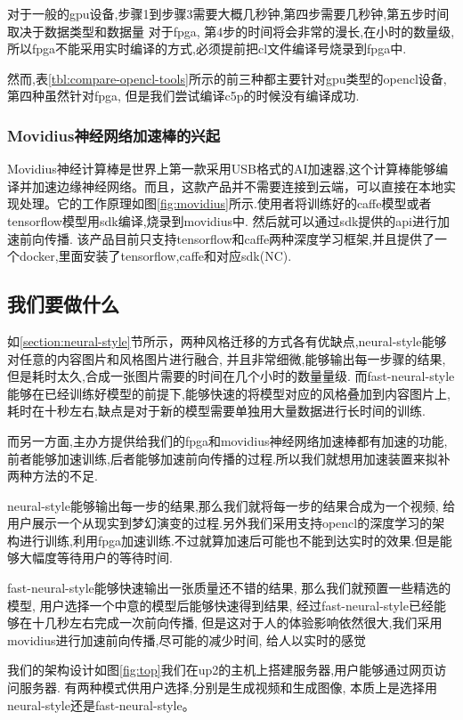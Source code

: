对于一般的gpu设备,步骤1到步骤3需要大概几秒钟,第四步需要几秒钟,第五步时间取决于数据类型和数据量
对于fpga, 第4步的时间将会非常的漫长,在小时的数量级,所以fpga不能采用实时编译的方式,必须提前把cl文件编译号烧录到fpga中.

然而,表\ref{tbl:compare-opencl-tools}所示的前三种都主要针对gpu类型的opencl设备,第四种虽然针对fpga, 但是我们尝试编译c5p的时候没有编译成功.

\subsubsection{Movidius神经网络加速棒的兴起}\label{sec:movidius}
Movidius神经计算棒是世界上第一款采用USB格式的AI加速器,这个计算棒能够编译并加速边缘神经网络。而且，这款产品并不需要连接到云端，可以直接在本地实现处理。它的工作原理如图\ref{fig:movidius}所示.使用者将训练好的caffe模型或者tensorflow模型用sdk编译,烧录到movidius中. 然后就可以通过sdk提供的api进行加速前向传播.
该产品目前只支持tensorflow和caffe两种深度学习框架,并且提供了一个docker,里面安装了tensorflow,caffe和对应sdk(NC).
\subsection{我们要做什么}
如\ref{section:neural-style}节所示，两种风格迁移的方式各有优缺点,neural-style能够对任意的内容图片和风格图片进行融合, 并且非常细微,能够输出每一步骤的结果,但是耗时太久,合成一张图片需要的时间在几个小时的数量量级. 而fast-neural-style能够在已经训练好模型的前提下,能够快速的将模型对应的风格叠加到内容图片上, 耗时在十秒左右,缺点是对于新的模型需要单独用大量数据进行长时间的训练.

而另一方面,主办方提供给我们的fpga和movidius神经网络加速棒都有加速的功能,前者能够加速训练,后者能够加速前向传播的过程.所以我们就想用加速装置来拟补两种方法的不足.

neural-style能够输出每一步的结果,那么我们就将每一步的结果合成为一个视频, 给用户展示一个从现实到梦幻演变的过程.另外我们采用支持opencl的深度学习的架构进行训练,利用fpga加速训练.不过就算加速后可能也不能到达实时的效果.但是能够大幅度等待用户的等待时间.

fast-neural-style能够快速输出一张质量还不错的结果, 那么我们就预置一些精选的模型,
用户选择一个中意的模型后能够快速得到结果, 经过fast-neural-style已经能够在十几秒左右完成一次前向传播,
但是这对于人的体验影响依然很大,我们采用movidius进行加速前向传播,尽可能的减少时间, 给人以实时的感觉

我们的架构设计如图\ref{fig:top}我们在up2的主机上搭建服务器,用户能够通过网页访问服务器. 
有两种模式供用户选择,分别是生成视频和生成图像, 本质上是选择用neural-style还是fast-neural-style。

